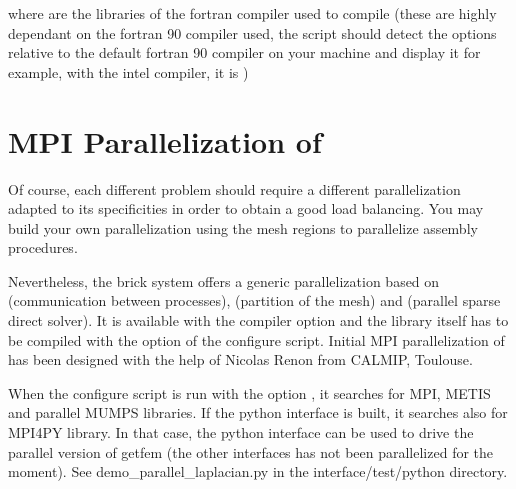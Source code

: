 \documentclass[a4paper,11pt,english]{sphinxmanual}
\begin{document}
where  are the libraries of the fortran compiler used to compile
 (these are highly dependant on the fortran 90 compiler used, the
 script should detect the options relative to the default fortran
90 compiler on your machine and display it \textendash{} for example, with the intel
 compiler, it is )


\chapter{MPI Parallelization of }
\label{\detokenize{userdoc/parallel:mpi-parallelization-of-gf}}\label{\detokenize{userdoc/parallel:ud-parallel}}\label{\detokenize{userdoc/parallel::doc}}
Of course, each different problem should require a different
parallelization adapted to its specificities in order to
obtain a good load balancing. You may build your own parallelization
using the mesh regions to parallelize assembly procedures.

Nevertheless, the brick system offers a generic parallelization based on 
(communication between processes),
(partition of the mesh)
and  (parallel sparse direct solver).
It is available with the compiler option 
and the library itself has to be compiled with the
option  of the configure script.
Initial MPI parallelization of  has been designed with the help of Nicolas Renon from CALMIP, Toulouse.

When the configure script is run with the option ,
it searches for MPI, METIS and parallel MUMPS libraries.
If the python interface is built, it searches also for MPI4PY library.
In that case, the python interface can
be used to drive the parallel version of getfem (the other interfaces has
not been parallelized for the moment). See demo\_parallel\_laplacian.py in
the interface/test/python directory.
\end{document}
